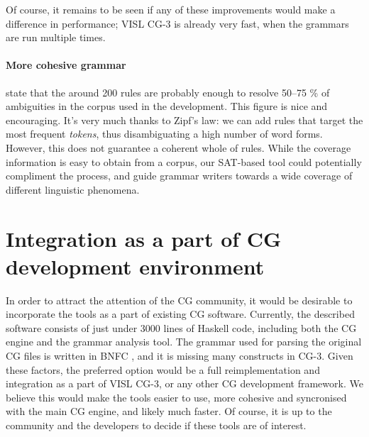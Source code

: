 Of course, it remains to be seen if any of these improvements would make a difference in performance; VISL CG-3 is already very fast, when the grammars are run multiple times.

\paragraph{More cohesive grammar} \cite{voutilainen2004} state that the around 200 rules are probably enough to resolve 50--75 \% of ambiguities in the corpus used in the development. 
This figure is nice and encouraging. It's very much thanks to Zipf's law: we can add rules that target the most frequent \emph{tokens}, thus disambiguating a high number of word forms. However, this does not guarantee a coherent whole of rules. 
While the coverage information is easy to obtain from a corpus, our SAT-based tool could potentially compliment the process, and guide grammar writers towards a wide coverage of different linguistic phenomena.

\section{Integration as a part of CG development environment}

In order to attract the attention of the CG community, it would be desirable to incorporate the tools as a part of existing CG software. 
Currently, the described software consists of just under 3000 lines of Haskell code, including both the CG engine and the grammar analysis tool.
The grammar used for parsing the original CG files is written in BNFC , and it is missing many constructs in CG-3. 
Given these factors, the preferred option would be a full reimplementation and integration as a part of VISL CG-3, or any other CG development framework. We believe this would make the tools easier to use, more cohesive and syncronised with the main CG engine, and likely much faster. Of course, it is up to the community and the developers to decide if these tools are of interest.










